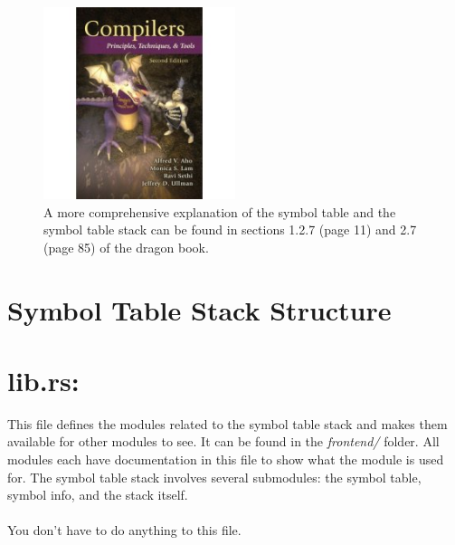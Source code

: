 \documentclass[
	12pt, %
]{fphw}
\begin{document}
\begin{figure}[h!]
    \centering
    \includegraphics[width=0.5\textwidth]{dragon.jpeg}
    \caption{A more comprehensive explanation of the symbol table and the symbol table stack can be found in sections 1.2.7 (page 11) and 2.7 (page 85) of the dragon book.}
    \label{fig:symbol_table_structure}
\end{figure}
\pagebreak

\section*{Symbol Table Stack Structure}



\section*{lib.rs:}
This file defines the modules related to the symbol table stack and makes them available for other modules to see. It can be found in the \textit{frontend/} folder. All modules each have documentation in this file to show what the module is used for. The symbol table stack involves several submodules: the symbol table, symbol info, and the stack itself.\\
\\
You don't have to do anything to this file.
\end{document}
